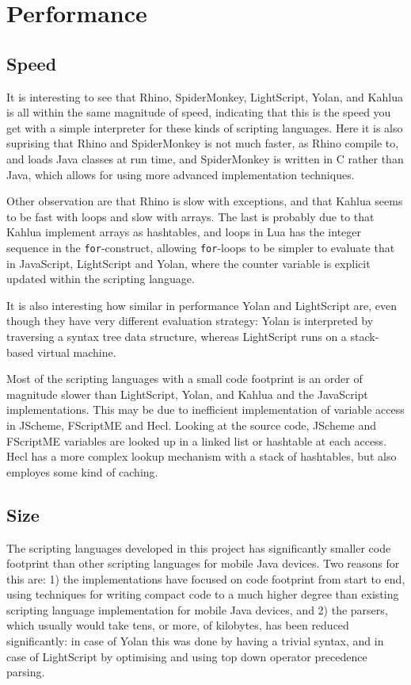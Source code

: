 \documentclass[11pt]{report}
\begin{document}
\section{Performance}
\subsection{Speed}
It is interesting to see that Rhino, SpiderMonkey, LightScript, Yolan, and Kahlua is all within the same magnitude of speed, indicating that this is the speed you get with a simple interpreter for these kinds of scripting languages. Here it is also suprising that Rhino and SpiderMonkey is not much faster, as Rhino compile to, and loads Java classes at run time, and SpiderMonkey is written in C rather than Java, which allows for using more advanced implementation techniques.

Other observation are that Rhino is slow with exceptions, and that Kahlua seems to be fast with loops and slow with arrays. The last is probably due to that Kahlua implement arrays as hashtables, and loops in Lua has the integer sequence in the \verb|for|-construct, allowing \verb|for|-loops to be simpler to evaluate that in JavaScript, LightScript and Yolan, where the counter variable is explicit updated within the scripting language.

It is also interesting how similar in performance Yolan and LightScript are, even though they have very different evaluation strategy: Yolan is interpreted by traversing a syntax tree data structure, whereas LightScript runs on a stack-based virtual machine. 

Most of the scripting languages with a small code footprint is an order of magnitude slower than LightScript, Yolan, and Kahlua and the JavaScript implementations.
This may be due to inefficient implementation of variable access in JScheme, FScriptME and Hecl. Looking at the source code, JScheme and FScriptME variables are looked up in a linked list or hashtable at each access. Hecl has a more complex lookup mechanism with a stack of hashtables, but also employes some kind of caching.

\subsection{Size}

The scripting languages developed in this project has significantly smaller code footprint than other scripting languages for mobile Java devices.
Two reasons for this are: 1) the implementations have focused on code footprint from start to end, using techniques for writing compact code to a much higher degree than existing scripting language implementation for mobile Java devices, and 2) the parsers, which usually would take tens, or more, of kilobytes, has been reduced significantly: in case of Yolan this was done by having a trivial syntax, and in case of LightScript by optimising and using top down operator precedence parsing.
\end{document}
